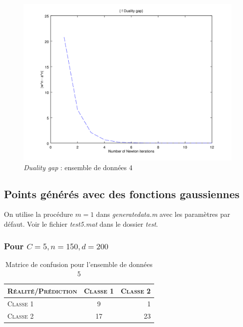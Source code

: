 \documentclass{article}
\begin{document}
         \begin{figure}[H]
           \begin{center}
             \includegraphics[scale=0.5]{images/duality4.png}
             \caption{\emph{Duality gap} : ensemble de données 4}
           \end{center}
         \end{figure}

\subsection{Points générés avec des fonctions gaussiennes}

On utilise la procédure $m=1$ dans \emph{generatedata.m} avec les paramètres par défaut. Voir le fichier \emph{test5.mat} dans le dossier \emph{test}.

\subsubsection{Pour $C=5, n=150, d=200$}

     \begin{table}[H]
       \caption{Matrice de confusion pour l'ensemble de données 5}
       \begin{tabular}{|l|c|r|}
         \hline
         \textsc{Réalité/Prédiction} & \textsc{Classe 1} & \textsc{Classe 2}\\
         \hline
         \textsc{Classe 1} & 9 & 1\\
         \hline
         \textsc{Classe 2} & 17 & 23\\
         \hline
       \end{tabular}
     \end{table}
\end{document}

